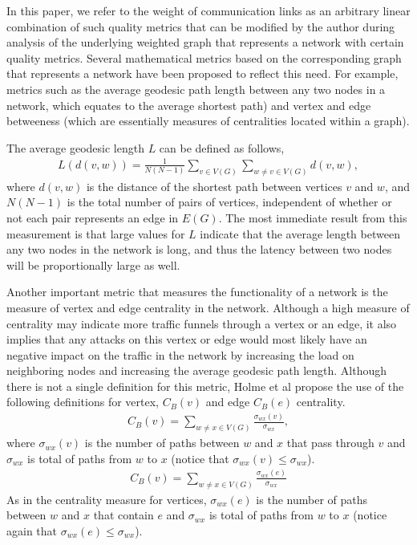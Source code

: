 \documentclass[11pt]{article}
\begin{document}

In this paper, we refer to the weight of communication links as an arbitrary linear combination of such quality metrics that can be modified by the author during analysis of the underlying weighted graph that represents a network with certain quality metrics. Several mathematical metrics based on the corresponding graph that represents a network have been proposed to reflect this need. For example, metrics such as the average geodesic path length between any two nodes in a network, which equates to the average shortest path) and vertex and edge betweeness (which are essentially measures of centralities located within a graph). 

The average geodesic length $L$ can be defined as follows,
\begin{eqnarray*}
L(d(v,w)) = \frac{1}{N(N-1)}\sum_{v \in V(G)}\sum_{w \not= v \in V(G)} d(v,w),
\end{eqnarray*}
where $d(v,w)$ is the distance of the shortest path between vertices $v$ and $w$, and $N(N-1)$ is the total number of pairs of vertices, independent of whether or not each pair represents an edge in $E(G)$. The most immediate result from this measurement is that large values for $L$ indicate that the average length between any two nodes in the network is long, and thus the latency between two nodes will be proportionally large as well. 

Another important metric that measures the functionality of a network is the measure of vertex and edge centrality in the network. Although a high measure of centrality may indicate more traffic funnels through a vertex or an edge, it also implies that any attacks on this vertex or edge would most likely have an negative impact on the traffic in the network by increasing the load on neighboring nodes and increasing the average geodesic path length. Although there is not a single definition for this metric, Holme et al \cite{Attacks} propose the use of the following definitions for vertex, $C_{B}(v)$ and edge $C_{B}(e)$ centrality.
\begin{eqnarray*}
C_{B}(v) = \sum_{w \not= x \in V(G)} \frac{\sigma_{wx}(v)}{\sigma_{wx}},
\end{eqnarray*}
where $\sigma_{wx}(v)$ is the number of paths between $w$ and $x$ that pass through $v$ and $\sigma_{wx}$ is total of paths from $w$ to $x$ (notice that $\sigma_{wx}(v) \leq \sigma_{wx}$).
\begin{eqnarray*}
C_{B}(v) = \sum_{w \not= x \in V(G)} \frac{\sigma_{wx}(e)}{\sigma_{wx}}
\end{eqnarray*}
As in the centrality measure for vertices, $\sigma_{wx}(e)$ is the number of paths between $w$ and $x$ that contain $e$ and $\sigma_{wx}$ is total of paths from $w$ to $x$ (notice again that $\sigma_{wx}(e) \leq \sigma_{wx}$).
\end{document}
